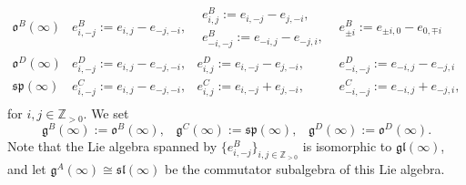\documentclass{emsprocart}
\begin{document}
$$\begin{array}{c|cccc}
\mathfrak o^B(\infty)&e^B_{i, -j}:=e_{i, j}-e_{-j, -i},&\begin{array}{c}e^B_{i, j}:=e_{i, -j}-e_{j, -i},\\e^B_{-i, -j}:=e_{-i, j}-e_{-j, i},\end{array}&e^B_{\pm i}:=e_{\pm i, 0}-e_{0, \mp i}\\\hline
\mathfrak o^D(\infty)&e^D_{i, -j}:=e_{i, j}-e_{-j, -i},&e^D_{i, j}:=e_{i, -j}-e_{j, -i},&e^D_{-i, -j}:=e_{-i, j}-e_{-j, i}&\\\hline
\mathfrak{sp}(\infty)&e^C_{i, -j}:=e_{i, j}-e_{-j, -i},&e^C_{i, j}:=e_{i, -j}+e_{j, -i},&e^C_{-i, -j}:=e_{-i, j}+e_{-j, i},&\\
\end{array}$$for $i, j\in\mathbb Z_{>0}$.
We set $$\mathfrak g^B(\infty):=\mathfrak o^B(\infty),\hspace{10pt}\mathfrak g^C(\infty):=\mathfrak{sp}(\infty),\hspace{10pt} \mathfrak g^D(\infty):=\mathfrak o^D(\infty).$$
Note that the Lie algebra spanned by $\{e_{i, -j}^B\}_{i, j\in\mathbb Z_{>0}}$  is isomorphic to $\mathfrak{gl}(\infty)$, and let $\mathfrak g^A(\infty)\cong\mathfrak{sl}(\infty)$ be the commutator subalgebra of this Lie algebra.
\end{document}

